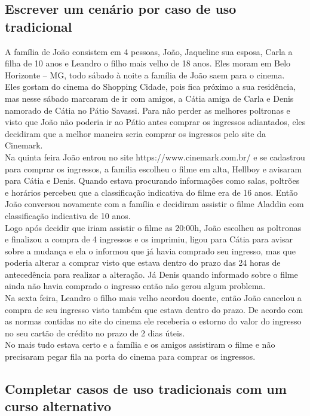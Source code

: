 \documentclass[12pt]{article}
\begin{document}
        \subsection{Escrever um cenário por caso de uso tradicional}
            A família de João consistem em 4 pessoas, João, Jaqueline sua esposa, Carla a filha de 10 anos e Leandro o filho mais velho de 18 anos. Eles moram em Belo Horizonte – MG, todo sábado à noite a família de João saem para o cinema. \\
            Eles gostam do cinema do Shopping Cidade, pois fica próximo a sua residência, mas nesse sábado marcaram de ir com amigos, a Cátia amiga de Carla e Denis namorado de Cátia no Pátio Savassi. Para não perder as melhores poltronas e visto que João não poderia ir ao Pátio antes comprar os ingressos adiantados, eles decidiram que a melhor maneira seria comprar os ingressos pelo site da Cinemark.\\
            Na quinta feira João entrou no site https://www.cinemark.com.br/ e se cadastrou para comprar os ingressos, a família escolheu o filme em alta, Hellboy e avisaram para Cátia e Denis. Quando estava procurando informações como salas, poltrões e horários percebeu que a classificação indicativa do filme era de 16 anos. Então João conversou novamente com a família e decidiram assistir o filme Aladdin com classificação indicativa de 10 anos. \\
            Logo após decidir que iriam assistir o filme as 20:00h, João escolheu as poltronas e finalizou a compra de 4 ingressos e os imprimiu, ligou para Cátia para avisar sobre a mudança e ela o informou que já havia comprado seu ingresso, mas que poderia alterar a comprar visto que estava dentro do prazo das 24 horas de antecedência para realizar a alteração. Já Denis quando informado sobre o filme ainda não havia comprado o ingresso então não gerou algum problema.\\
            Na sexta feira, Leandro o filho mais velho acordou doente, então João cancelou a compra de seu ingresso visto também que estava dentro do prazo. De acordo com as normas contidas no site do cinema ele receberia o estorno do valor do ingresso no seu cartão de crédito no prazo de 2 dias úteis.\\
            No mais tudo estava certo e a família e os amigos assistiram o filme e não precisaram pegar fila na porta do cinema para comprar os ingressos.

        \subsection{Completar casos de uso tradicionais com um curso alternativo}
        
\end{document}
